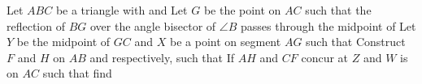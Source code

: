 Let $ABC$ be a triangle with   and  Let $G$ be the point on $AC$ such that the reflection of $BG$ over the angle bisector of $\angle B$ passes through the midpoint of  Let $Y$ be the midpoint of $GC$ and $X$ be a point on segment $AG$ such that  Construct $F$ and $H$ on $AB$ and  respectively, such that  If $AH$ and $CF$ concur at $Z$ and $W$ is on $AC$ such that  find 